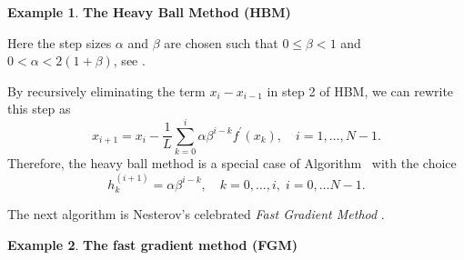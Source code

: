 \documentclass[12pt]{article}
\numberwithin{equation}{section}
\theoremstyle{definition}
\newtheorem{example}{Example}[section]
\theoremstyle{remark}
\newcommand{\mainalg}{\text{FO}\xspace}
\newcommand{\fastgradalg}{\text{FGM}\xspace}
\newcommand{\heavyalg}{\text{(HBM)}\xspace}
\begin{document}
\begin{example}
\textbf{The Heavy Ball Method (HBM)}

\medskip

Here the step sizes $\alpha$ and  $\beta$ are chosen such that $0 \leq \beta < 1$ and $0 < \alpha <
2(1+\beta)$, see \cite{polyak1964}.

By recursively eliminating the term $x_i-x_{i-1}$ in step 2 of HBM, we can rewrite this step
as
\[
    x_{i+1}= x_i - \frac{1}{L} \sum_{k=0}^{i} \alpha \beta^{i-k} f^\prime(x_k),\quad i=1,\dots,N-1.
\]
Therefore, the heavy ball method is a special case of Algorithm~\mainalg with the choice
$$h^{(i+1)}_{k}= \alpha \beta^{i-k}, \quad  k=0, \ldots, i, \; i=0, \ldots N-1 .$$
\end{example}

\medskip

The next algorithm  is Nesterov's celebrated \emph{Fast Gradient Method} \cite{nest83}.

\begin{example}\textbf{The fast gradient method (FGM)}

\end{example}
\end{document}
